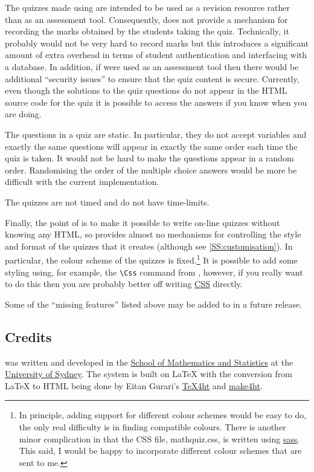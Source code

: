 \documentclass[svgnames]{article}
\begin{document}
    The quizzes made using \MathQuiz are intended to be used as a
    revision resource rather than as an assessment tool. Consequently,
    \MathQuiz does not provide a mechanism for recording the marks
    obtained by the students taking the quiz. Technically, it probably
    would not be very hard to record marks but this introduces a
    significant amount of extra overhead in terms of student
    authentication and interfacing with a database. In addition, if
    \MathQuiz were used as an assessment tool then there would be
    additional ``security issues'' to ensure that the quiz content is
    secure. Currently, even though the solutions to the quiz questions
    do not appear in the HTML source code for the quiz it is possible to
    access the answers if you know when you are doing.

    The questions in a \MathQuiz quiz are static. In particular, they do
    not accept variables and exactly the same questions will appear in
    exactly the same order each time the quiz is taken. It would not be
    hard to make the questions appear in a random order. Randomising the
    order of the multiple choice answers would be more be difficult with
    the current implementation.

    The quizzes are not timed and do not have time-limits.

    Finally, the point of \MathQuiz is to make it possible to write
    on-line quizzes without knowing any HTML, so \MathQuiz provides
    almost no mechanisms for controlling the style and format of the
    quizzes that it creates (although see \autoref{SS:customisation}).
    In particular, the colour scheme of the quizzes is
    fixed.\footnote{In principle, adding support for different colour
    schemes would be easy to do, the only real difficulty is in finding
    compatible colours. There is another minor complication in that the
    \MathQuiz CSS file, \textsf{mathquiz.css}, is written using
    \href{http://sass-lang.com/}{sass}. This said, I would be happy to
    incorporate different colour schemes that are sent to me.}
    It is possible to add some styling using, for example, the
    \Verb|\Css| command from , however, if you really want
    to do this then you are probably better off writing
    \href{https://www.w3schools.com/css/}{CSS} directly.

    Some of the ``missing features'' listed above may be added to \MathQuiz in a future release.

\subsection{Credits}
    \MathQuiz{} was written and developed in the
    \href{http://www.maths.usyd.edu.au/}{School of Mathematics and
    Statistics} at the \href{http://www.usyd.edu.au/}{University of
    Sydney}.  The system is built on \LaTeX{} with the conversion from
    \LaTeX{} to HTML being done by Eitan Gurari's
    \href{http://www.cis.ohio-state.edu/~gurari/TeX4ht/mn.html}{TeX4ht}
    and
    \href{https://github.com/michal-h21/make4ht}{make4ht}.
\end{document}
